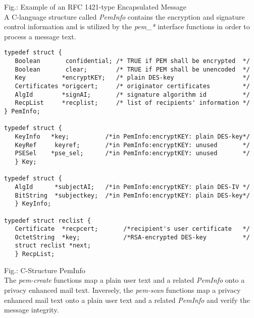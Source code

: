\label{fig-isw-pem}
{\footnotesize Fig.:
Example of an RFC 1421-type Encapsulated Message}
\\[1em]
A C-language structure called {\em PemInfo}
contains the encryption and signature control information
and is utilized by the {\em pem\_*} interface functions
in order to process a message text.

{\small
\begin{verbatim}
typedef struct {
   Boolean       confidential; /* TRUE if PEM shall be encrypted  */
   Boolean       clear;        /* TRUE if PEM shall be unencoded  */
   Key          *encryptKEY;   /* plain DES-key                   */
   Certificates *origcert;     /* originator certificates         */
   AlgId        *signAI;       /* signature algorithm id          */
   RecpList     *recplist;     /* list of recipients' information */
} PemInfo;

typedef struct {
   KeyInfo   *key;          /*in PemInfo:encryptKEY: plain DES-key*/
   KeyRef     keyref;       /*in PemInfo:encryptKEY: unused       */
   PSESel    *pse_sel;      /*in PemInfo:encryptKEY: unused       */
   } Key;

typedef struct {
   AlgId      *subjectAI;   /*in PemInfo:encryptKEY: plain DES-IV */
   BitString  *subjectkey;  /*in PemInfo:encryptKEY: plain DES-key*/
   } KeyInfo;

typedef struct reclist {
   Certificate  *recpcert;       /*recipient's user certificate   */
   OctetString  *key;            /*RSA-encrypted DES-key          */
   struct reclist *next;
   } RecpList;
\end{verbatim}
}

\label{fig-isw-pem2}
{\footnotesize Fig.: C-Structure PemInfo}
\\[1em]
The {\em pem-create} functions map
a plain user text and a related {\em PemInfo} onto
a privacy enhanced mail text.
Inversely, the {\em pem-scan} functions map
a privacy enhanced mail text onto
a plain user text and a related {\em PemInfo}
and verify the message integrity.

